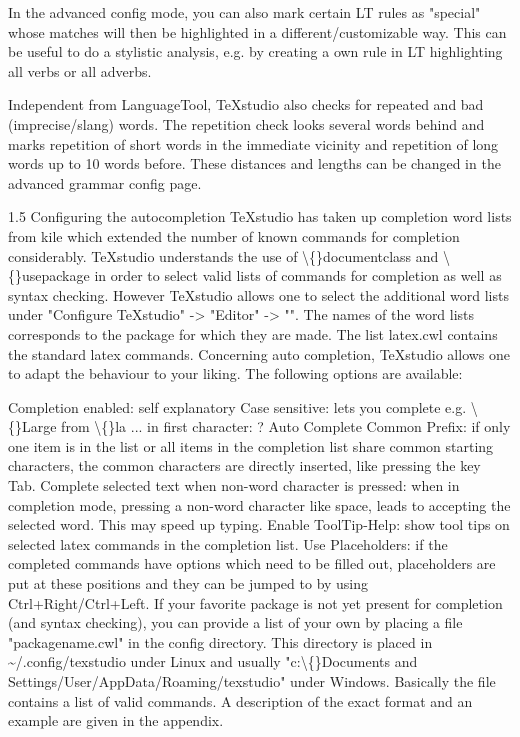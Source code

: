 \documentclass{article}
\begin{document}
	In the advanced config mode, you can also mark certain LT rules as "special" whose matches will then be highlighted in a different/customizable way. This can be useful to do a stylistic analysis, e.g. by creating a own rule in LT highlighting all verbs or all adverbs.
	
	Independent from LanguageTool, TeXstudio also checks for repeated and bad (imprecise/slang) words. The repetition check looks several words behind and marks repetition of short words in the immediate vicinity and repetition of long words up to 10 words before. These distances and lengths can be changed in the advanced grammar config page.
	
	1.5 Configuring the autocompletion
	TeXstudio has taken up completion word lists from kile which extended the number of known commands for completion considerably. TeXstudio understands the use of \textbackslash\{\}documentclass and \textbackslash\{\}usepackage in order to select valid lists of commands for completion as well as syntax checking. However TeXstudio allows one to select the additional word lists under "Configure TeXstudio" -> "Editor" -> "". The names of the word lists corresponds to the package for which they are made. The list latex.cwl contains the standard latex commands.
	Concerning auto completion, TeXstudio allows one to adapt the behaviour to your liking. The following options are available:
	
	Completion enabled: self explanatory
	Case sensitive: lets you complete e.g. \textbackslash\{\}Large from \textbackslash\{\}la ...
	in first character: ?
	Auto Complete Common Prefix: if only one item is in the list or all items in the completion list share common starting characters, the common characters are directly inserted, like pressing the key Tab.
	Complete selected text when non-word character is pressed: when in completion mode, pressing a non-word character like space, leads to accepting the selected word. This may speed up typing.
	Enable ToolTip-Help: show tool tips on selected latex commands in the completion list.
	Use Placeholders: if the completed commands have options which need to be filled out, placeholders are put at these positions and they can be jumped to by using Ctrl+Right/Ctrl+Left.
	If your favorite package is not yet present for completion (and syntax checking), you can provide a list of your own by placing a file "packagename.cwl" in the config directory. This directory is placed in \~{}/.config/texstudio under Linux and usually "c:\textbackslash\{\}Documents and Settings/User/AppData/Roaming/texstudio" under Windows. Basically the file contains a list of valid commands. A description of the exact format and an example are given in the appendix.
	
\end{document}
